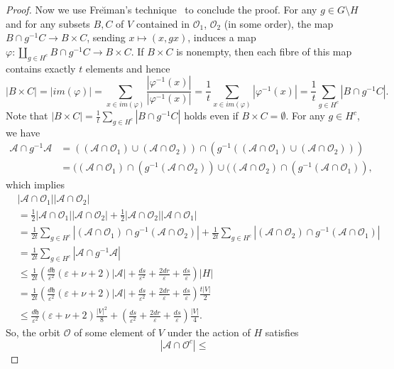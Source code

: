 \documentclass[10pt]{article}
\theoremstyle{definition}
\newcommand{\mo}{{-1}}
\newcommand{\calO}{\ensuremath{\mathcal{O}}}
\newcommand{\scrA}{\ensuremath{\mathscr{A}}}
\newcommand{\tth}{\ensuremath{\mathfrak{h}}}
\begin{document}
\begin{proof}
Now we use Fre\u{\i}man's technique~\cite{FreimanGroupsInverseProb} to conclude the proof. For any $g\in G \setminus H$ and for any subsets $B, C$ of $V$ contained in $\calO_1$, $\calO_2$ (in some order), the map 
$B\cap g^\mo C \to B\times C$, sending 
$x\mapsto (x, gx)$, induces a map 
$\varphi: \coprod _{g\in H^c} B\cap g^\mo C \to B\times C$. 
If $B \times C$ is nonempty, then each fibre of this map contains exactly $t$ elements and hence 
$$
|B\times C|
= |im(\varphi)|
= \sum_{x\in im(\varphi) } \frac{|\varphi^\mo (x)|} {|\varphi^\mo (x)|}
= \frac 1 t \sum_{x\in im(\varphi)} |\varphi^\mo (x)|
= \frac 1 t \sum_{g\in H^c} |B\cap g^\mo C|.$$
Note that 
$|B\times C|
= \frac 1 t \sum_{g\in H^c} |B\cap g^\mo C|$
holds even if $B \times C = \emptyset$. 
For any $g\in H^c$, we have 
\begin{align*}
\scrA\cap g^\mo \scrA
& = 
((\scrA\cap \calO_1) \cup (\scrA\cap \calO_2))
\cap 
(g^\mo ((\scrA\cap \calO_1) \cup (\scrA\cap \calO_2)))\\
& = 
((\scrA\cap \calO_1) \cap 
(g^\mo (\scrA\cap \calO_2))
\cup 
((\scrA\cap \calO_2) \cap 
(g^\mo (\scrA\cap \calO_1)),
\end{align*}
which implies 
\begin{align*}
& |\scrA \cap \calO_1| |\scrA\cap \calO_2|\\
& = \frac 12 |\scrA \cap \calO_1| |\scrA\cap \calO_2| + 
\frac 12 |\scrA \cap \calO_2| |\scrA\cap \calO_1|\\
& =
\frac 1 {2t} \sum_{g\in H^c} |(\scrA \cap \calO_1) \cap g^\mo (\scrA \cap \calO_2)| 
+ 
\frac 1{2 t} \sum_{g\in H^c} |(\scrA \cap \calO_2) \cap g^\mo (\scrA \cap \calO_1)| \\
& = 
\frac 1 {2t} \sum_{g\in H^c} |\scrA \cap g^\mo \scrA|\\
& 
\leq \frac 1 {2t} 
\left(
\frac{d \tth}{\varepsilon^2} (\varepsilon + \nu + 2)|\scrA| 
+ \frac{ds}{\varepsilon^2} + \frac{2dr}\varepsilon + \frac{ds}{\varepsilon}
\right)|H|\\
& 
= \frac 1 {2t} 
\left(
\frac{d \tth}{\varepsilon^2} (\varepsilon + \nu + 2)|\scrA| 
+\frac{ds}{\varepsilon^2} + \frac{2dr}\varepsilon + \frac{ds}{\varepsilon}
\right)
\frac{t|V|}2\\
& 
\leq 
\frac{d \tth}{\varepsilon^2} (\varepsilon + \nu + 2)
\frac{|V|^2}8
+ 
\left(\frac{ds}{\varepsilon^2} + \frac{2dr}\varepsilon + \frac{ds}{\varepsilon}
\right)
\frac{|V|}4.
\end{align*}
So, the orbit $\calO$ of some element of $V$ under the action of $H$ satisfies 
$$
|\scrA\cap \calO^c| \leq 
$$
\end{proof}
\end{document}
